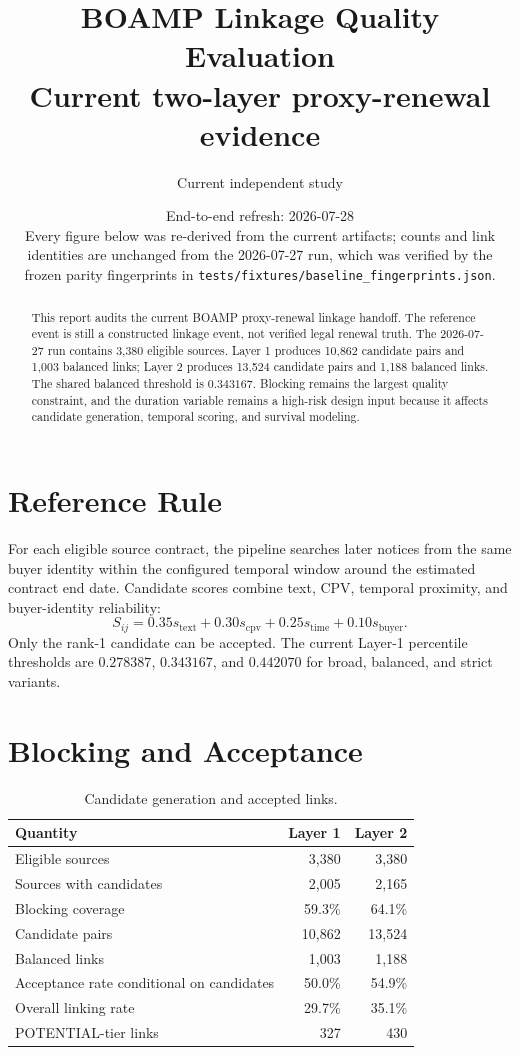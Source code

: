 \documentclass[11pt]{article}
\title{BOAMP Linkage Quality Evaluation\\
\large Current two-layer proxy-renewal evidence}
\author{Current independent study}
\date{End-to-end refresh: 2026-07-28\\
\small Every figure below was re-derived from the current artifacts; counts and link
identities are unchanged from the 2026-07-27 run, which was verified by the frozen
parity fingerprints in \texttt{tests/fixtures/baseline\_fingerprints.json}.}
\begin{document}
\maketitle

\begin{abstract}
This report audits the current BOAMP proxy-renewal linkage handoff. The
reference event is still a constructed linkage event, not verified legal
renewal truth. The 2026-07-27 run contains 3{,}380 eligible sources. Layer 1
produces 10{,}862 candidate pairs and 1{,}003 balanced links; Layer 2 produces
13{,}524 candidate pairs and 1{,}188 balanced links. The shared balanced
threshold is \(0.343167\). Blocking remains the largest quality constraint,
and the duration variable remains a high-risk design input because it affects
candidate generation, temporal scoring, and survival modeling.
\end{abstract}

\section{Reference Rule}

For each eligible source contract, the pipeline searches later notices from the
same buyer identity within the configured temporal window around the estimated
contract end date. Candidate scores combine text, CPV, temporal proximity, and
buyer-identity reliability:
\[
S_{ij}=0.35s_{\mathrm{text}}+0.30s_{\mathrm{cpv}}+0.25s_{\mathrm{time}}+0.10s_{\mathrm{buyer}}.
\]
Only the rank-1 candidate can be accepted. The current Layer-1 percentile
thresholds are \(0.278387\), \(0.343167\), and \(0.442070\) for broad,
balanced, and strict variants.

\section{Blocking and Acceptance}

\begin{table}[h!]
\centering
\caption{Candidate generation and accepted links.}
\begin{tabular}{lrr}
\toprule
Quantity & Layer 1 & Layer 2 \\
\midrule
Eligible sources & 3{,}380 & 3{,}380 \\
Sources with candidates & 2{,}005 & 2{,}165 \\
Blocking coverage & 59.3\% & 64.1\% \\
Candidate pairs & 10{,}862 & 13{,}524 \\
Balanced links & 1{,}003 & 1{,}188 \\
Acceptance rate conditional on candidates & 50.0\% & 54.9\% \\
Overall linking rate & 29.7\% & 35.1\% \\
POTENTIAL-tier links & 327 & 430 \\
\bottomrule
\end{tabular}
\end{table}
\end{document}
